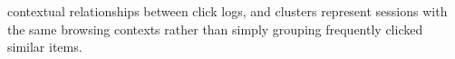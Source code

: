 \documentclass[a4paper,oneside,12pt]{book}
\begin{document}
contextual relationships between click logs, and clusters represent sessions with the same browsing contexts rather than simply grouping frequently clicked similar items. 





\end{document}
